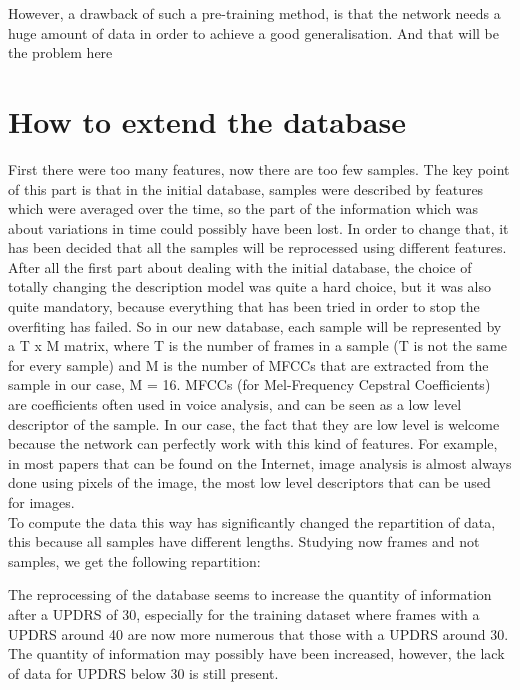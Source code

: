\documentclass{report}
\begin{document}
		However, a drawback of such a pre-training method, is that the network needs a huge amount of data in order to achieve a good generalisation. And that will be the problem here
		
		\section{How to extend the database}
		
		First there were too many features, now there are too few samples. The key point of this part is that in the initial database, samples were described by features which were averaged over the time, so the part of the information which was about variations in time could possibly have been lost. In order to change that, it has been decided that all the samples will be reprocessed using different features. After all the first part about dealing with the initial database, the choice of totally changing the description model was quite a hard choice, but it was also quite mandatory, because everything that has been tried in order to stop the overfiting has failed. So in our new database, each sample will be represented by a T x M matrix, where T is the number of frames in a sample (T is not the same for every sample) and M is the number of MFCCs that are extracted from the sample in our case, M = 16. MFCCs (for Mel-Frequency Cepstral Coefficients) are coefficients often used in voice analysis, and can be seen as a low level descriptor of the sample. In our case, the fact that they are low level is welcome because the network can perfectly work with this kind of features. For example, in most papers that can be found on the Internet, image analysis is almost always done using pixels of the image, the most low level descriptors that can be used for images.\\
		
		To compute the data this way has significantly changed the repartition of data, this because all samples have different lengths. Studying now frames and not samples, we get the following repartition:
		
		
		The reprocessing of the database seems to increase the quantity of information after a UPDRS of 30, especially for the training dataset where frames with a UPDRS around 40 are now more numerous that those with a UPDRS around 30. The quantity of information may possibly have been increased, however, the lack of data for UPDRS below 30 is still present.
		
\end{document}
